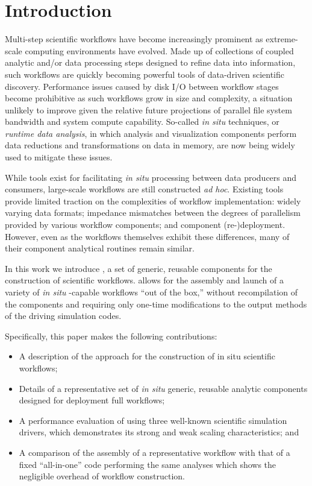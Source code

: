 
\newcommand{\insitu}{\textit{in situ }}
\section{Introduction}
\label{s:intro}

Multi-step scientific workflows have become increasingly prominent as
extreme-scale computing environments have evolved. Made up of collections of
coupled analytic and/or data processing steps designed to refine data into
information, such workflows are quickly becoming powerful tools of data-driven
scientific discovery.
Performance issues caused by disk I/O between
workflow stages become prohibitive
as such workflows grow in size and complexity,
a situation unlikely to improve
given the relative future projections of parallel
file system bandwidth and system
compute capability. So-called \textit{in situ}
techniques, or \textit{runtime data analysis},
in which analysis and visualization
components perform data reductions and transformations
on data in memory, are now being widely used to mitigate these issues. 

While tools exist for facilitating \insitu processing
between data producers and consumers, large-scale workflows
are still constructed  \textit{ad hoc}. Existing
tools provide limited traction on the complexities of
workflow implementation:
widely varying data formats; impedance mismatches
between the degrees of parallelism provided by various workflow
components; and component (re-)deployment.
However, even as the workflows themselves exhibit
these differences, many of their component
analytical routines remain similar.

In this work we introduce \sys, a set of generic, reusable components
for the construction of scientific workflows.
\sys allows for the assembly and launch of a
variety of \insitu -capable workflows ``out of the box,'' without
recompilation of the components and requiring only one-time
modifications to the
output methods of the driving simulation codes.

Specifically, this paper makes the following contributions:
\begin{itemize}
\item A description of the \sys approach
  for the construction
  of in situ scientific workflows;
\item Details of a representative set of \insitu generic,
  reusable analytic components designed for deployment
  full \sys workflows;
\item A performance evaluation of \sys using three
  well-known scientific simulation
  drivers, which demonstrates its strong and weak scaling
  characteristics; and
\item A comparison of the assembly of a representative \sys workflow with
  that of a fixed ``all-in-one'' code performing the same analyses which
  shows the negligible overhead of \sys workflow construction.
\end{itemize}

